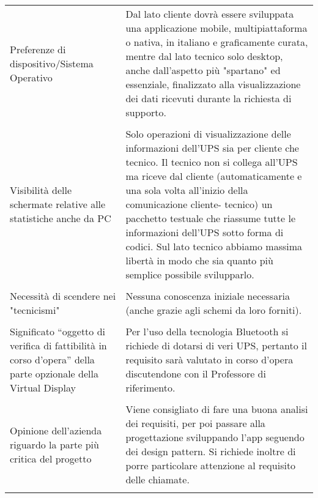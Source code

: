 \begin{longtable}{|p{7cm}|p{8cm}|}
    Preferenze di dispositivo/Sistema Operativo
    &
    Dal lato cliente dovrà essere
    sviluppata una applicazione
    mobile, multipiattaforma o
    nativa, in italiano e
    graficamente curata, mentre
    dal lato tecnico solo desktop,
    anche dall'aspetto più
    "spartano" ed essenziale,
    finalizzato alla visualizzazione
    dei dati ricevuti durante la
    richiesta di supporto.\\

    & \\

    Visibilità delle schermate relative alle
    statistiche anche da PC     
    &
    Solo operazioni di
    visualizzazione delle
    informazioni dell’UPS sia per
    cliente che tecnico. Il tecnico
    non si collega all’UPS ma
    riceve dal cliente
    (automaticamente e una sola
    volta all’inizio della
    comunicazione cliente-
    tecnico) un pacchetto testuale
    che riassume tutte le
    informazioni dell’UPS
    sotto forma di codici. Sul lato
    tecnico abbiamo massima
    libertà in modo che sia quanto
    più semplice possibile
    svilupparlo.\\

    & \\

    Necessità di scendere nei "tecnicismi"
    &
    Nessuna conoscenza iniziale
    necessaria (anche grazie agli
    schemi da loro forniti).\\
    
    & \\
    
    Significato “oggetto di
    verifica di fattibilità in corso
    d’opera” della parte opzionale
    della Virtual Display
    &
    Per l'uso della tecnologia
    Bluetooth si richiede di dotarsi
    di veri UPS, pertanto il
    requisito sarà valutato in corso
    d'opera discutendone con il
    Professore di riferimento.\\

    & \\

    Opinione dell'azienda riguardo la parte più
    critica del progetto     
    &
    Viene consigliato di fare una
    buona analisi dei requisiti, per
    poi passare alla progettazione
    sviluppando l'app seguendo
    dei design pattern. Si richiede
    inoltre di porre particolare
    attenzione al requisito delle
    chiamate.\\

    & \\
    \hline
\end{longtable}

